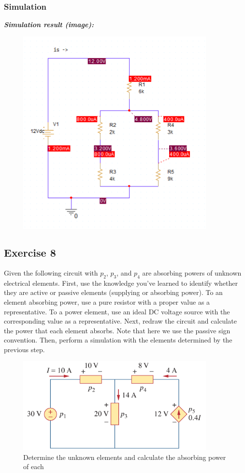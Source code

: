 \subsubsection{Simulation}
\textit{\textbf{Simulation result (image):}}
\begin{figure}[H]
    \centering
    \includegraphics[width = 10cm]{source/picture/bai_1/ex7_sim.png}
\end{figure}
\newpage

\subsection{Exercise 8}
Given the following circuit with $p_2$, $p_3$, and $p_4$ are absorbing powers of unknown electrical elements. First, use the knowledge you've learned to identify whether they are active or passive elements (supplying or absorbing power). To an element absorbing power, use a pure resistor with a proper value as a representative. To a power element, use an ideal DC voltage source with the corresponding value as a representative. Next, redraw the circuit and calculate the power that each element absorbs. Note that here we use the passive sign convention. Then, perform a simulation with the elements determined by the previous step.

\begin{figure}[H]
    \centering
    \includegraphics[width =  10cm]{source/picture/bai_1/lab1_ex8_de.png}
    \caption{Determine the unknown elements and calculate the absorbing power of each}
    \label{lab1_ex8_de}
\end{figure}


